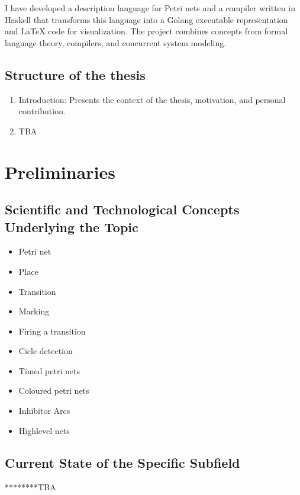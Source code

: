 \documentclass[12pt]{article}
\begin{document}
    I have developed a description language for Petri nets and a compiler written in Haskell 
    that transforms this language into a Golang executable representation and LaTeX code for visualization. 
    The project combines concepts from formal language theory, compilers, 
    and concurrent system modeling.

    \subsection{Structure of the thesis}
    \begin{enumerate}
        \item Introduction: Presents the context of the thesis, motivation, and personal contribution.
        \item TBA
    \end{enumerate}
\section{Preliminaries}
    \subsection{Scientific and Technological Concepts Underlying the Topic}
    \begin{itemize}
        \item Petri net
        \item Place
        \item Transition
        \item Marking
        \item Firing a transition
        \item Cicle detection
        \item Timed petri nets
        \item Coloured petri nets
        \item Inhibitor Arcs
        \item Highlevel nets
    \end{itemize}
    \subsection{Current State of the Specific Subfield}
    ********TBA
\end{document}
